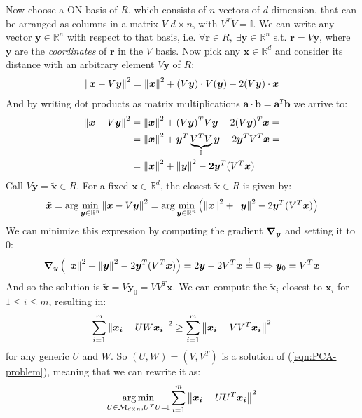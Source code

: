 \documentclass[../template.tex]{subfiles}
\begin{document}
\begin{itemize}
    Now choose a ON basis of $R$, which consists of $n$ vectors of $d$ dimension, that can be arranged as columns in a matrix $V$ $d \times n$, with $V^T V = \mathbb{I}$. We can write any vector $\bm{y} \in \mathbb{R}^n$  with respect to that basis, i.e. $\forall \bm{r} \in R, \> \exists \bm{y} \in \mathbb{R}^n$ s.t. $\bm{r} = V\bm{y}$, where $\bm{y}$ are the \textit{coordinates} of $\bm{r}$ in the $V$ basis. Now pick any $\bm{x} \in \mathbb{R}^d$ and consider its distance with an arbitrary element $V\bm{y}$ of $R$:
    \begin{align*}
        \norm{\bm{x} - V \bm{y}}^2 = \norm{\bm{x}}^2 + (V\bm{y}) \cdot V(\bm{y}) - 2 (V\bm{y}) \cdot \bm{x}
    \end{align*}
    And by writing dot products as matrix multiplications $\bm{a} \cdot \bm{b} = \bm{a}^T \bm{b}$ we arrive to:
    \begin{align*}
        \norm{\bm{x} - V \bm{y}}^2 &= \norm{\bm{x}}^2 + (V\bm{y})^T V\bm{y} - 2(V \bm{y})^T \bm{x} =\\
        &= \norm{\bm{x}}^2 + \bm{y}^T \underbrace{V^T V}_{\mathbb{I}} \bm{y} - 2\bm{y}^T V^T \bm{x} =\\
        &= \norm{\bm{x}}^2 + \norm{\bm{y}}^2 -\bm{2y}^T (V^T \bm{x})
    \end{align*} 
    Call $V\bm{y} = \tilde{\bm{x}} \in R$. For a fixed $\bm{x} \in \mathbb{R}^d$, the closest $\tilde{\bm{x}} \in R$ is given by:
    \begin{align*}
        \tilde{\bm{x}} = \arg\min_{\bm{y} \in \mathbb{R}^n} \norm{\bm{x} - V\bm{y}}^2 = \arg\min_{\bm{y} \in \mathbb{R}^n} \left(\norm{\bm{x}}^2 + \norm{\bm{y}}^2 -2 \bm{y}^T (V^T \bm{x})\right)
    \end{align*}
    We can minimize this expression by computing the gradient $\grad_{\bm{y}}$ and setting it to $0$:
    \begin{align*}
       \bm{\nabla}_{\bm{y}}\left(\norm{\bm{x}}^2 + \norm{\bm{y}}^2 -2 \bm{y}^T (V^T \bm{x})\right) =  2 \bm{y} - 2 V^T \bm{x} \overset{!}{=}  0 \Rightarrow \bm{y}_0 = V^T \bm{x} 
    \end{align*}
    And so the solution is $\tilde{\bm{x}} = V \bm{y}_0 = V V^T \bm{x}$. We can compute the $\tilde{\bm{x}}_i$ closest to $\bm{x}_i$ for $1 \leq i \leq m$, resulting in:
    \begin{align*}
        \sum_{i=1}^m \norm{\bm{x_i} - UW \bm{x_i}}^2 \geq \sum_{i=1}^m \norm{\bm{x_i} - V V^T \bm{x_i}}^2
    \end{align*}
    for any generic $U$ and $W$. So $(U,W) = (V,V^T)$ is a solution of (\ref{eqn:PCA-problem}), meaning that we can rewrite it as:
    \begin{align*}
        \underset{U \in \mathcal{M}_{d \times n}, U^T U = \mathbb{I}}{\arg\min} \sum_{i=1}^m \norm{\bm{x_i} - U U^T \bm{x_i} }^2
    \end{align*}


\end{itemize}
\end{document}
